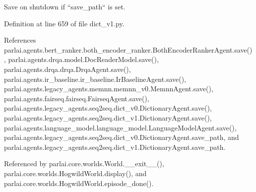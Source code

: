\begin{DoxyVerb}Save on shutdown if ``save_path`` is set.\end{DoxyVerb}
 

Definition at line 659 of file dict\+\_\+v1.\+py.



References parlai.\+agents.\+bert\+\_\+ranker.\+both\+\_\+encoder\+\_\+ranker.\+Both\+Encoder\+Ranker\+Agent.\+save(), parlai.\+agents.\+drqa.\+model.\+Doc\+Reader\+Model.\+save(), parlai.\+agents.\+drqa.\+drqa.\+Drqa\+Agent.\+save(), parlai.\+agents.\+ir\+\_\+baseline.\+ir\+\_\+baseline.\+Ir\+Baseline\+Agent.\+save(), parlai.\+agents.\+legacy\+\_\+agents.\+memnn.\+memnn\+\_\+v0.\+Memnn\+Agent.\+save(), parlai.\+agents.\+fairseq.\+fairseq.\+Fairseq\+Agent.\+save(), parlai.\+agents.\+legacy\+\_\+agents.\+seq2seq.\+dict\+\_\+v0.\+Dictionary\+Agent.\+save(), parlai.\+agents.\+legacy\+\_\+agents.\+seq2seq.\+dict\+\_\+v1.\+Dictionary\+Agent.\+save(), parlai.\+agents.\+language\+\_\+model.\+language\+\_\+model.\+Language\+Model\+Agent.\+save(), parlai.\+agents.\+legacy\+\_\+agents.\+seq2seq.\+dict\+\_\+v0.\+Dictionary\+Agent.\+save\+\_\+path, and parlai.\+agents.\+legacy\+\_\+agents.\+seq2seq.\+dict\+\_\+v1.\+Dictionary\+Agent.\+save\+\_\+path.



Referenced by parlai.\+core.\+worlds.\+World.\+\_\+\+\_\+exit\+\_\+\+\_\+(), parlai.\+core.\+worlds.\+Hogwild\+World.\+display(), and parlai.\+core.\+worlds.\+Hogwild\+World.\+episode\+\_\+done().

